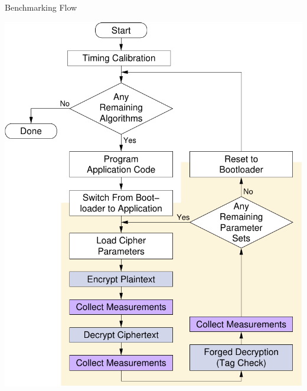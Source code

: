 \documentclass[xcolor=pdftex,dvipsnames,table,final]{beamer}
\begin{document}
\begin{frame}[fragile]{}
\begin{columns}[t, totalwidth=\textwidth]
\begin{column}{.675\linewidth}
\begin{columns}
\begin{column}{.473\linewidth}
      \begin{block}{Benchmarking Flow}
        \begin{center}
          \includegraphics[scale=1.208]{../figures/xxbx_flow}
        \end{center} 
      \end{block}
     

\end{column}
\end{columns}
\end{column}
\end{columns}
\end{frame}
\end{document}

